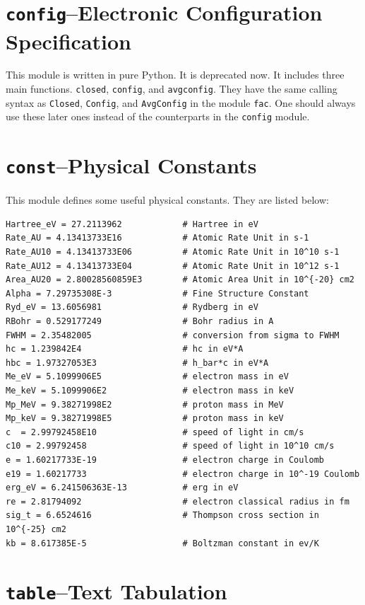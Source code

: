 \documentclass[twoside,letterpaper]{refrep}
\newcommand{\key}[1]{\texttt{#1}}
\newcommand{\mod}[1]{\texttt{#1}}
\begin{document}
\section{\mod{config}--Electronic Configuration Specification}
\label{sec:config}
This module is written in pure Python. It is deprecated now. It includes three
main functions. \key{closed}, \key{config}, and \key{avgconfig}. They have the
same calling syntax as \key{Closed}, \key{Config}, and
\key{AvgConfig} in the module \mod{fac}. One should always use these later
ones instead of the counterparts in the \mod{config} module.

\section{\mod{const}--Physical Constants}
\label{sec:const}
This module defines some useful physical constants. They are listed below:
\begin{verbatim}
Hartree_eV = 27.2113962            # Hartree in eV   
Rate_AU = 4.13413733E16            # Atomic Rate Unit in s-1
Rate_AU10 = 4.13413733E06          # Atomic Rate Unit in 10^10 s-1
Rate_AU12 = 4.13413733E04          # Atomic Rate Unit in 10^12 s-1
Area_AU20 = 2.80028560859E3        # Atomic Area Unit in 10^{-20} cm2
Alpha = 7.29735308E-3              # Fine Structure Constant
Ryd_eV = 13.6056981                # Rydberg in eV
RBohr = 0.529177249                # Bohr radius in A
FWHM = 2.35482005                  # conversion from sigma to FWHM
hc = 1.239842E4                    # hc in eV*A
hbc = 1.97327053E3                 # h_bar*c in eV*A
Me_eV = 5.1099906E5                # electron mass in eV
Me_keV = 5.1099906E2               # electron mass in keV
Mp_MeV = 9.38271998E2              # proton mass in MeV
Mp_keV = 9.38271998E5              # proton mass in keV
c  = 2.99792458E10                 # speed of light in cm/s
c10 = 2.99792458                   # speed of light in 10^10 cm/s
e = 1.60217733E-19                 # electron charge in Coulomb
e19 = 1.60217733                   # electron charge in 10^-19 Coulomb
erg_eV = 6.241506363E-13           # erg in eV
re = 2.81794092                    # electron classical radius in fm
sig_t = 6.6524616                  # Thompson cross section in 10^{-25} cm2
kb = 8.617385E-5                   # Boltzman constant in ev/K
\end{verbatim}

\section{\mod{table}--Text Tabulation}
\label{sec:table}
\end{document}

